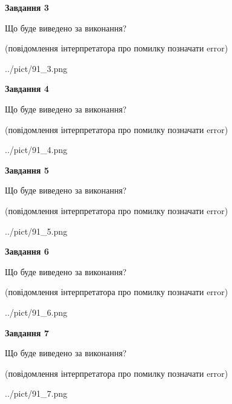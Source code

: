 \documentclass[12pt, ukrainian]{article}
\begin{document}
{\begin {large}
{\begin {center}\textbf{Завдання 3}\end {center}}\par
Що буде виведено за виконання?\par
 (повідомлення інтерпретатора про помилку позначати error)\par
\begin{center}
	{../pict/91_3.png}
\end{center}
\newpage

{\begin {center}\textbf{Завдання 4}\end {center}}\par
Що буде виведено за виконання?\par
 (повідомлення інтерпретатора про помилку позначати error)\par
\begin{center}
	{../pict/91_4.png}
\end{center}
\newpage

{\begin {center}\textbf{Завдання 5}\end {center}}\par
Що буде виведено за виконання?\par
 (повідомлення інтерпретатора про помилку позначати error)\par
\begin{center}
	{../pict/91_5.png}
\end{center}
\newpage

{\begin {center}\textbf{Завдання 6}\end {center}}\par
Що буде виведено за виконання?\par
 (повідомлення інтерпретатора про помилку позначати error)\par
\begin{center}
	{../pict/91_6.png}
\end{center}
\newpage

{\begin {center}\textbf{Завдання 7}\end {center}}\par
Що буде виведено за виконання?\par
 (повідомлення інтерпретатора про помилку позначати error)\par
\begin{center}
	{../pict/91_7.png}
\end{center}
\newpage


\end{large}}
\end{document}
